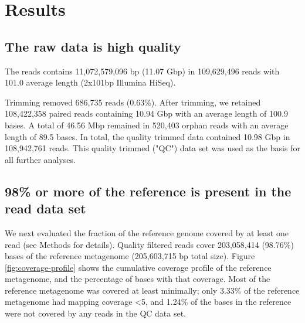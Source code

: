 \documentclass[10pt,a4paper,twocolumn]{article}
\begin{document}
\section*{Results}

\subsection*{The raw data is high quality}


The reads contains 11,072,579,096 bp (11.07 Gbp) in 109,629,496 reads
with 101.0 average length (2x101bp Illumina HiSeq).

Trimming removed 686,735 reads (0.63\%).  After trimming, we retained
108,422,358 paired reads containing 10.94 Gbp with an average length of
100.9 bases. A total of 46.56 Mbp remained in 520,403 orphan reads with
an average length of 89.5 bases. In total, the quality trimmed data
contained 10.98 Gbp in 108,942,761 reads.  This quality trimmed ("QC")
data set was used as the basis for all further analyses.



\subsection*{98\% or more of the reference is present in the read data set}

We next evaluated the fraction of the reference genome covered by at least
one read (see Methods for details). Quality filtered reads cover
203,058,414 (98.76\%) bases of the reference metagenome (205,603,715
bp total size).  Figure \ref{fig:coverage-profile} shows the
cumulative coverage profile of the reference metagenome, and the
percentage of bases with that coverage. Most of the reference
metagenome was covered at least minimally; only 3.33\% of the
reference metagenome had mapping coverage \textless 5, and 1.24\% of
the bases in the reference were not covered by any reads in the QC data
set.
\end{document}
